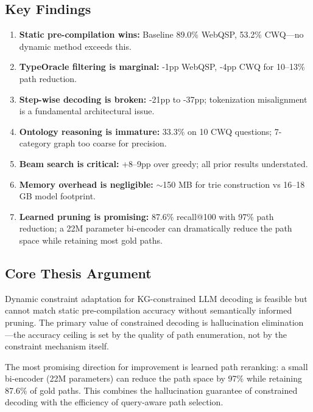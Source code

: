 \documentclass[11pt,twoside]{article}
\begin{document}
\subsection{Key Findings}

\begin{enumerate}
  \item \textbf{Static pre-compilation wins:} Baseline 89.0\% WebQSP, 53.2\%
        CWQ---no dynamic method exceeds this.
  \item \textbf{TypeOracle filtering is marginal:} -1pp WebQSP, -4pp CWQ for
        10--13\% path reduction.
  \item \textbf{Step-wise decoding is broken:} -21pp to -37pp; tokenization
        misalignment is a fundamental architectural issue.
  \item \textbf{Ontology reasoning is immature:} 33.3\% on 10 CWQ questions;
        7-category graph too coarse for precision.
  \item \textbf{Beam search is critical:} +8--9pp over greedy; all prior
        results understated.
  \item \textbf{Memory overhead is negligible:} \(\sim\)150 MB for trie
        construction vs 16--18 GB model footprint.
  \item \textbf{Learned pruning is promising:} 87.6\% recall@100 with 97\%
        path reduction; a 22M parameter bi-encoder can dramatically reduce the
        path space while retaining most gold paths.
\end{enumerate}

\subsection{Core Thesis Argument}

Dynamic constraint adaptation for KG-constrained LLM decoding is feasible but
cannot match static pre-compilation accuracy without semantically informed
pruning. The primary value of constrained decoding is hallucination
elimination---the accuracy ceiling is set by the quality of path enumeration,
not by the constraint mechanism itself.

The most promising direction for improvement is learned path reranking: a small
bi-encoder (22M parameters) can reduce the path space by 97\% while retaining
87.6\% of gold paths. This combines the hallucination guarantee of constrained
decoding with the efficiency of query-aware path selection.

\end{document}
